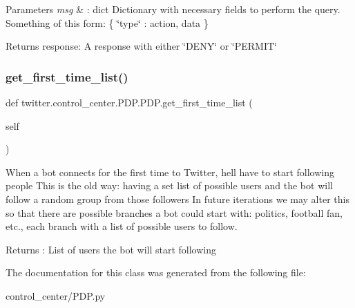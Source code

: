 \begin{DoxyParams}{Parameters}
{\em msg} & \+: dict Dictionary with necessary fields to perform the query. Something of this form\+: \{ \char`\"{}type\char`\"{} \+: action, data \}\\
\hline
\end{DoxyParams}
\begin{DoxyReturn}{Returns}
response\+: A response with either \char`\"{}\+D\+E\+N\+Y\char`\"{} or \char`\"{}\+P\+E\+R\+M\+I\+T\char`\"{} 
\end{DoxyReturn}
\mbox{\label{classtwitter_1_1control__center_1_1PDP_1_1PDP_a5ac3bf5edb6f1913f09aecf0fe1ccc7f}} 
\subsubsection{\texorpdfstring{get\+\_\+first\+\_\+time\+\_\+list()}{get\_first\_time\_list()}}
{\footnotesize\ttfamily def twitter.\+control\+\_\+center.\+P\+D\+P.\+P\+D\+P.\+get\+\_\+first\+\_\+time\+\_\+list (\begin{DoxyParamCaption}\item[{}]{self }\end{DoxyParamCaption})}



When a bot connects for the first time to Twitter, he\textquotesingle{}ll have to start following people This is the old way\+: having a set list of possible users and the bot will follow a random group from those followers In future iterations we may alter this so that there are possible branches a bot could start with\+: politics, football fan, etc., each branch with a list of possible users to follow. 

\begin{DoxyReturn}{Returns}
\+: List of users the bot will start following 
\end{DoxyReturn}


The documentation for this class was generated from the following file\+:\begin{DoxyCompactItemize}
\item 
control\+\_\+center/P\+D\+P.\+py\end{DoxyCompactItemize}
